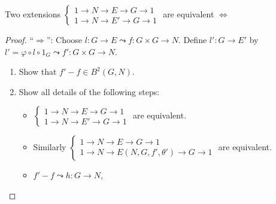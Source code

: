 \begin{theorem}
  Two extensions $\begin{cases}
    1\to N\to E\to G\to 1 \\
    1\to N\to E'\to G\to 1
  \end{cases}$ are equivalent $\iff$ 

  \begin{proof}
    ``$\Rightarrow$'': Choose $l: G\to E \leadsto f: G\times G \to N$.
    Define $l': G\to E'$ by $l' = \varphi \circ l \circ 1_G \leadsto
    f': G\times G \to N$.
    \begin{exercise} \mbox{}
      \begin{enumerate}[(1)]
        \item Show that $f' - f \in B^2(G, N)$.
        \item Show all details of the following steps:
          \begin{itemize}
            \item $\begin{cases}
                1\to N\to E\to G\to 1 \\
                1\to N\to E'\to G\to 1
              \end{cases}$ are equivalent.
            \item Similarly $\begin{cases}
                1\to N\to E\to G\to 1 \\
                1\to N\to E(N, G, f', \theta')\to G\to 1
              \end{cases}$ are equivalent.
            \item $f'-f \leadsto h:G\to N$,
          \end{itemize}
      \end{enumerate}
    \end{exercise}
  \end{proof}

\end{theorem}

